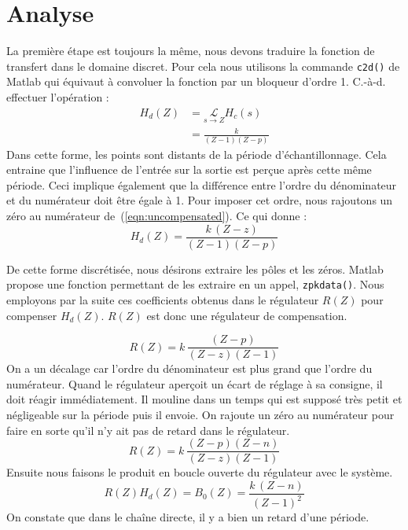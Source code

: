 \section{Analyse}
La première étape est toujours la même, nous devons traduire la fonction de transfert dans le domaine discret.
Pour cela nous utilisons la commande \texttt{c2d()} de Matlab\textregistered{} qui équivaut à convoluer la fonction par un bloqueur d'ordre 1.
C.-à-d. effectuer l'opération :
\begin{align}
	H_d(Z) &= \underset{s\rightarrow Z}{\mathcal{L}} H_c(s) \\[2mm]
		   &= \frac{k}{(Z-1)(Z-p)}
		   \label{eqn:uncompensated}
\end{align}
Dans cette forme, les points sont distants de la période d'échantillonnage.
Cela entraine que l'influence de l'entrée sur la sortie est perçue après cette même période.
Ceci implique également que la différence entre l'ordre du dénominateur et du numérateur doit être égale à 1.
Pour imposer cet ordre, nous rajoutons un zéro au numérateur de~(\ref{eqn:uncompensated}).
Ce qui donne :
\begin{equation}
	H_d(Z) = \frac{k\,(Z-z)}{(Z-1)(Z-p)}
\end{equation}

De cette forme discrétisée, nous désirons extraire les pôles et les zéros.
Matlab\textregistered{} propose une fonction permettant de les extraire en un appel, \texttt{zpkdata()}.
Nous employons par la suite ces coefficients obtenus dans le régulateur $R(Z)$ pour compenser $H_d(Z)$.
$R(Z)$ est donc une régulateur de compensation.

\begin{equation}
	R(Z) = k\,\frac{(Z-p)}{(Z-z)(Z-1)}
\end{equation}
On a un décalage car l'ordre du dénominateur est plus grand que l'ordre du numérateur.
Quand le régulateur aperçoit un écart de réglage à sa consigne, il doit réagir immédiatement.
Il \og{}mouline\fg{} dans un temps qui est supposé très petit et négligeable sur la période puis il envoie.
On rajoute un zéro au numérateur pour faire en sorte qu'il n'y ait pas de retard dans le régulateur.
\begin{equation}
	R(Z) = k\,\frac{(Z-p)(Z-n)}{(Z-z)(Z-1)}
\end{equation}
Ensuite nous faisons le produit en boucle ouverte du régulateur avec le système.
\begin{equation}
	R(Z)H_d(Z) = B_0(Z) = \frac{k\,(Z-n)}{(Z-1)^2}
\end{equation}
On constate que dans le chaîne directe, il y a bien un retard d'une période.

